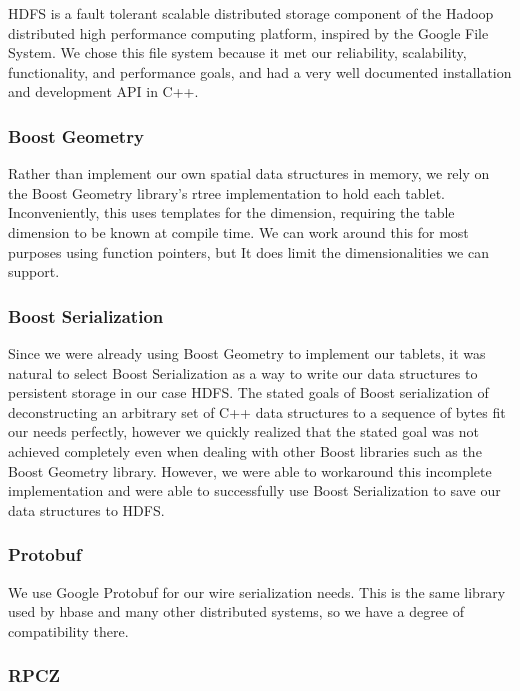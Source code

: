 \documentclass[11pt]{article}
\begin{document}
HDFS is a fault tolerant scalable distributed storage component of the Hadoop distributed high performance computing platform, inspired by the Google File System. We chose this file system because it met our reliability, scalability, functionality, and performance goals, and had a very well documented installation and development API in C++. 

\subsubsection{Boost Geometry}

Rather than implement our own spatial data structures in memory, we rely on the Boost Geometry library's rtree implementation to hold each tablet. Inconveniently, this uses templates for the dimension, requiring the table dimension to be known at compile time. We can work around this for most purposes using function pointers, but It does limit the dimensionalities we can support.

\subsubsection{Boost Serialization}

Since we were already using Boost Geometry to implement our tablets, it was natural to select Boost Serialization as a way to write our data structures to persistent storage in our case HDFS. The stated goals of Boost serialization of deconstructing an arbitrary set of C++ data structures to a sequence of bytes fit our needs perfectly, however we quickly realized that the stated goal was not achieved completely even when dealing with other Boost libraries such as the Boost Geometry library. However, we were able to workaround this incomplete implementation and were able to successfully use Boost Serialization to save our data structures to HDFS.

\subsubsection{Protobuf}

We use Google Protobuf for our wire serialization needs. This is the same library used by hbase and many other distributed systems, so we have a degree of compatibility there.

\subsubsection{RPCZ}
\end{document}
